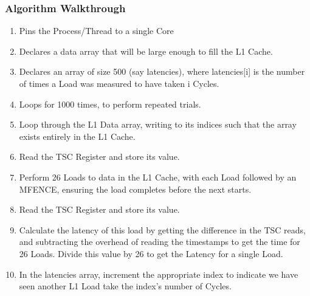 \documentclass[bsc,frontabs,twoside,singlespacing,parskip,deptreport]{infthesis}     %
\begin{document}
\subsubsection{Algorithm Walkthrough}
\begin{enumerate}
    \item Pins the Process/Thread to a single Core
    \item Declares a data array that will be large enough to fill the L1 Cache.
    \item Declares an array of size 500 (say latencies), where latencies[i] is the number of times a Load was measured to have taken i Cycles.
    \item Loops for 1000 times, to perform repeated trials.
    \item Loop through the L1 Data array, writing to its indices such that the array exists entirely in the L1 Cache.
    \item Read the TSC Register and store its value.
    \item Perform 26 Loads to data in the L1 Cache, with each Load followed by an MFENCE\cite{mfence_spec}, ensuring the load completes before the next starts.
    \item Read the TSC Register and store its value.
    \item Calculate the latency of this load by getting the difference in the TSC reads, and subtracting the overhead of reading the timestamps to get the time for 26 Loads. Divide this value by 26 to get the Latency for a single Load.
    \item In the latencies array, increment the appropriate index to indicate we have seen another L1 Load take the index's number of Cycles.
\end{enumerate}
\end{document}

